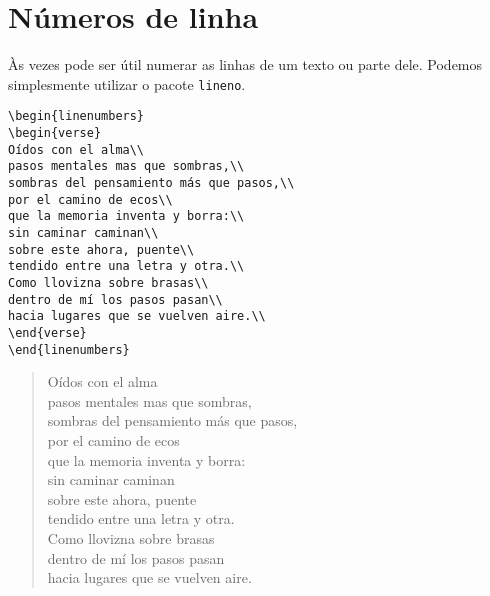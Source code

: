 \section{Números de linha}

Às vezes pode ser útil numerar as linhas de um texto ou parte dele.
Podemos simplesmente utilizar o pacote \texttt{lineno}.

\begin{verbatim}
\begin{linenumbers}
\begin{verse}
Oídos con el alma\\
pasos mentales mas que sombras,\\
sombras del pensamiento más que pasos,\\
por el camino de ecos\\
que la memoria inventa y borra:\\
sin caminar caminan\\
sobre este ahora, puente\\
tendido entre una letra y otra.\\
Como llovizna sobre brasas\\
dentro de mí los pasos pasan\\
hacia lugares que se vuelven aire.\\
\end{verse}
\end{linenumbers}
\end{verbatim}

\begin{linenumbers}
\begin{verse}
Oídos con el alma\\
pasos mentales mas que sombras,\\
sombras del pensamiento más que pasos,\\
por el camino de ecos\\
que la memoria inventa y borra:\\
sin caminar caminan\\
sobre este ahora, puente\\
tendido entre una letra y otra.\\
Como llovizna sobre brasas\\
dentro de mí los pasos pasan\\
hacia lugares que se vuelven aire.\\
\end{verse}
\end{linenumbers}
